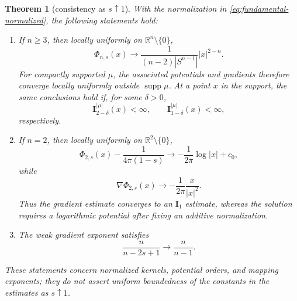 \documentclass[10pt,a4paper]{amsart}
\numberwithin{equation}{section}
\newtheorem{theorem}{Theorem}[section]
\newcommand{\R}{\mathbb R}
\newcommand{\I}{\mathbf I}
\begin{document}
\begin{theorem}[consistency as $s\uparrow1$]
\label{thm:s-to-one}
With the normalization in \eqref{eq:fundamental-normalized}, the following
statements hold:
\begin{enumerate}
\item If $n\ge3$, then locally uniformly on $\R^n\setminus\{0\}$,
\begin{equation}\label{eq:newton-limit}
 \Phi_{n,s}(x)\longrightarrow
 \frac{1}{(n-2)|S^{n-1}|}|x|^{2-n}.
\end{equation}
For compactly supported $\mu$, the associated potentials and gradients
therefore converge locally uniformly outside $\operatorname{supp}\mu$.
At a point $x$ in the support, the same conclusions hold if, for some
$\delta>0$,
\begin{equation}\label{eq:s-limit-dominating-potentials}
 \I_{2-\delta}^{|\mu|}(x)<\infty,
 \qquad \I_{1-\delta}^{|\mu|}(x)<\infty,
\end{equation}
respectively.
\item If $n=2$, then locally uniformly on $\R^2\setminus\{0\}$,
\begin{equation}\label{eq:log-limit}
 \Phi_{2,s}(x)-\frac{1}{4\pi(1-s)}
 \longrightarrow -\frac{1}{2\pi}\log|x|+c_0,
\end{equation}
while
\begin{equation}\label{eq:gradient-log-limit}
 \nabla\Phi_{2,s}(x)\longrightarrow
 -\frac{1}{2\pi}\frac{x}{|x|^2}.
\end{equation}
Thus the gradient estimate converges to an $\I_1$ estimate, whereas the
solution requires a logarithmic potential after fixing an additive
normalization.
\item The weak gradient exponent satisfies
\begin{equation}\label{eq:weak-exponent-limit}
 \frac{n}{n-2s+1}\longrightarrow\frac{n}{n-1}.
\end{equation}
\end{enumerate}
These statements concern normalized kernels, potential orders, and mapping
exponents; they do not assert uniform boundedness of the constants in the
estimates as $s\uparrow1$.
\end{theorem}
\end{document}
